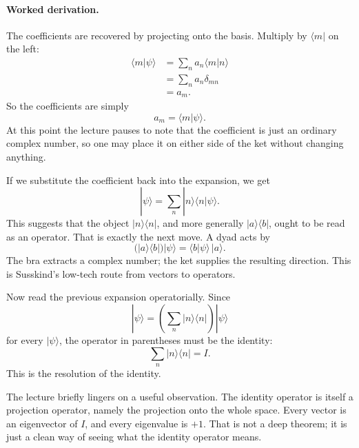 \paragraph{Worked derivation.} The coefficients are recovered by projecting onto the basis. Multiply by \(\langle m|\) on the left:
\begin{align}
\langle m|\psi\rangle
  &= \sum_n a_n \langle m|n\rangle \\
  &= \sum_n a_n \delta_{mn} \\
  &= a_m.
\end{align}
So the coefficients are simply
\begin{equation}
a_m = \langle m|\psi\rangle.
\end{equation}
At this point the lecture pauses to note that the coefficient is just an ordinary complex number, so one may place it on either side of the ket without changing anything.

If we substitute the coefficient back into the expansion, we get
\begin{equation}
|\psi\rangle = \sum_n |n\rangle \langle n|\psi\rangle.
\end{equation}
This suggests that the object \(|n\rangle\langle n|\), and more generally \(|a\rangle\langle b|\), ought to be read as an operator. That is exactly the next move. A dyad acts by
\begin{equation}
\bigl(|a\rangle\langle b|\bigr)|\psi\rangle = \langle b|\psi\rangle\,|a\rangle.
\end{equation}
The bra extracts a complex number; the ket supplies the resulting direction. This is Susskind's low-tech route from vectors to operators.

Now read the previous expansion operatorially. Since
\begin{equation}
|\psi\rangle = \left(\sum_n |n\rangle\langle n|\right)|\psi\rangle
\end{equation}
for every \(|\psi\rangle\), the operator in parentheses must be the identity:
\begin{equation}
\sum_n |n\rangle\langle n| = I.
\end{equation}
This is the resolution of the identity.

The lecture briefly lingers on a useful observation. The identity operator is itself a projection operator, namely the projection onto the whole space. Every vector is an eigenvector of \(I\), and every eigenvalue is \(+1\). That is not a deep theorem; it is just a clean way of seeing what the identity operator means.


